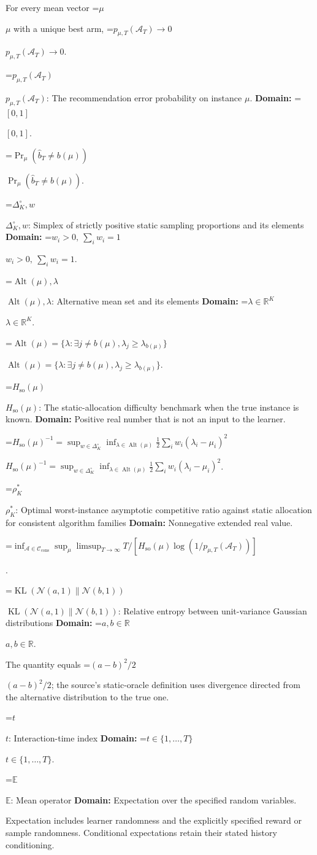 \documentclass[10pt,a4paper]{article}
\newcommand{\AtlasMath}[1]{\par\begingroup\centering\setbox0=\hbox{$\displaystyle #1$}\ifdim\wd0>1.4\linewidth\typeout{ATLAS WIDE FORMULA: \the\wd0}\fi\ifdim\wd0>\linewidth\resizebox{\linewidth}{!}{\box0}\else\box0\fi\par\endgroup}
\newcommand{\AtlasInlineMath}[1]{\begingroup\setbox0=\hbox{$#1$}\ifdim\wd0>.4\linewidth\endgroup\AtlasMath{#1}\else\endgroup$#1$\fi}
\begin{document}
For every mean vector \AtlasInlineMath{\mu} with a unique best arm, \AtlasInlineMath{p_{\mu,T}(\mathcal A_T)\to0}.

\AtlasInlineMath{p_{\mu,T}(\mathcal A_T)}: The recommendation error probability on instance $\mu$. \textbf{Domain:} \AtlasInlineMath{[0,1]}.

\AtlasInlineMath{\Pr_\mu(\widehat b_T\ne b(\mu))}.

\AtlasInlineMath{\Delta_K^\circ,w}: Simplex of strictly positive static sampling proportions and its elements \textbf{Domain:} \AtlasInlineMath{w_i>0,\ \sum_iw_i=1}.

\AtlasInlineMath{\operatorname{Alt}(\mu),\lambda}: Alternative mean set and its elements \textbf{Domain:} \AtlasInlineMath{\lambda\in\mathbb R^K}.

\AtlasInlineMath{\operatorname{Alt}(\mu)=\{\lambda:\exists j\ne b(\mu),\lambda_j\ge\lambda_{b(\mu)}\}}.

\AtlasInlineMath{H_{\mathrm{so}}(\mu)}: The static-allocation difficulty benchmark when the true instance is known. \textbf{Domain:} Positive real number that is not an input to the learner.

\AtlasInlineMath{H_{\mathrm{so}}(\mu)^{-1}=\sup_{w\in\Delta_K^\circ}\inf_{\lambda\in\operatorname{Alt}(\mu)}\frac12\sum_iw_i(\lambda_i-\mu_i)^2}.

\AtlasInlineMath{\rho_K^*}: Optimal worst-instance asymptotic competitive ratio against static allocation for consistent algorithm families \textbf{Domain:} Nonnegative extended real value.


\AtlasMath{\inf_{\mathcal A\in\mathcal C_{\mathrm{cons}}}\sup_\mu\limsup_{T\to\infty}T/[H_{\mathrm{so}}(\mu)\log(1/p_{\mu,T}(\mathcal A_T))]}
.

\AtlasInlineMath{\operatorname{KL}(\mathcal N(a,1)\|\mathcal N(b,1))}: Relative entropy between unit-variance Gaussian distributions \textbf{Domain:} \AtlasInlineMath{a,b\in\mathbb R}.

The quantity equals \AtlasInlineMath{(a-b)^2/2}; the source's static-oracle definition uses divergence directed from the alternative distribution to the true one.

\AtlasInlineMath{t}: Interaction-time index \textbf{Domain:} \AtlasInlineMath{t\in\{1,\ldots,T\}}.

\AtlasInlineMath{\mathbb E}: Mean operator \textbf{Domain:} Expectation over the specified random variables.

Expectation includes learner randomness and the explicitly specified reward or sample randomness. Conditional expectations retain their stated history conditioning.
\end{document}
